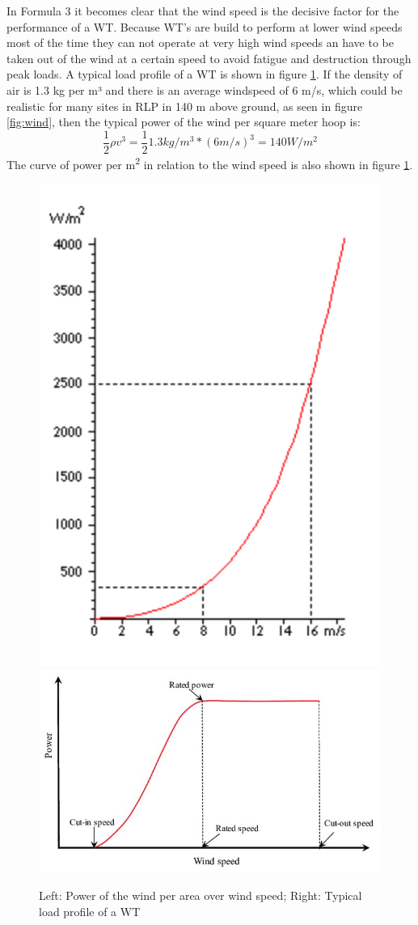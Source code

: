 \documentclass[a4paper,11pt]{article}
\begin{document}
In Formula 3 it becomes clear that the wind speed is the decisive factor for the performance of a WT. Because WT's are build to perform at lower wind speeds most of the time they can not operate at very high wind speeds an have to be taken out of the wind at a certain speed to avoid fatigue and destruction through peak loads. A typical load profile of a WT is shown in figure \ref{fig:powerofwind}. If the density of air is 1.3 kg per m³ and there is an average windspeed of 6 m/s, which could be realistic for many sites in RLP in 140 m above ground, as seen in figure \ref{fig:wind}, then the typical power of the wind per square meter hoop is:
\begin{equation}
\frac{1}{2} \rho v^3=\frac{1}{2}1.3 kg/m^3 * (6 m/s)^3=140 W/m^2
\end{equation}
The curve of power per m\textsuperscript{2} in relation to the wind speed is also shown in figure \ref{fig:powerofwind}.
\begin{figure}

{\centering \includegraphics[width=0.49\linewidth,height=0.25\textheight]{figures/power2} \includegraphics[width=0.49\linewidth,height=0.25\textheight]{figures/Typical-wind-power-output-versus-wind-speed_W640} 

}

\caption{Left: Power of the wind per area over wind speed; Right: Typical load profile of a WT}\label{fig:powerofwind}
\end{figure}
\end{document}
